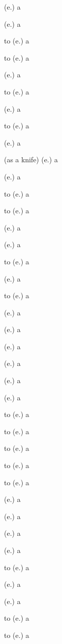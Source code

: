 \begin{glosses}
\par {} (e.) {a}
\par {} (e.) {a}
\par to  (e.) {a}
\par to  (e.) {a}
\par {} (e.) {a}
\par to  (e.) {a}
\par {} (e.) {a}
\par to  (e.) {a}
\par {} (e.) {a}
\par {} (as a knife) (e.) {a}
\par {} (e.) {a}
\par to  (e.) {a}
\par to  (e.) {a}
\par {} (e.) {a}
\par {} (e.) {a}
\par to  (e.) {a}
\par {} (e.) {a}
\par to  (e.) {a}
\par {} (e.) {a}
\par {} (e.) {a}
\par {} (e.) {a}
\par {} (e.) {a}
\par {} (e.) {a}
\par {} (e.) {a}
\par to  (e.) {a}
\par to  (e.) {a}
\par to  (e.) {a}
\par to  (e.) {a}
\par to  (e.) {a}
\par {} (e.) {a}
\par {} (e.) {a}
\par {} (e.) {a}
\par {} (e.) {a}
\par to  (e.) {a}
\par {} (e.) {a}
\par {} (e.) {a}
\par to  (e.) {a}
\par to  (e.) {a}
\end{glosses}

